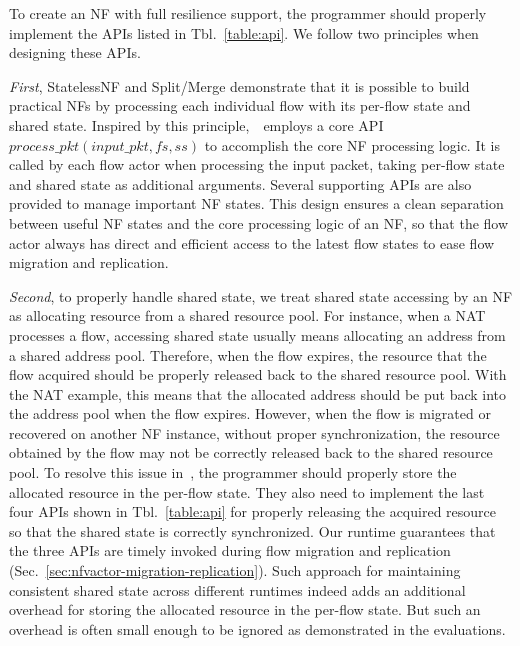To create an NF with full resilience support, the programmer should properly implement the APIs listed in Tbl.~\ref{table:api}. We follow two principles when designing these APIs.

{\em First}, StatelessNF \cite{201545} and Split/Merge \cite{rajagopalan2013split} demonstrate that it is possible to build practical NFs by processing each individual flow with its per-flow state and shared state. Inspired by this principle,~\nfactor~employs a core API $process\_pkt(input\_pkt, fs, ss)$ to accomplish the core NF processing logic. It is called by each flow actor when processing the input packet, taking per-flow state and shared state as additional arguments. Several supporting APIs are also provided to manage important NF states. This design %
 ensures a clean separation between useful NF states and the core processing logic of an NF, so that the flow actor always has direct and efficient access to the latest flow states to ease flow migration and replication.

{\em Second}, to properly handle shared state, we treat shared state accessing by an NF as allocating resource from a shared resource pool. For instance, when a NAT processes a flow, accessing shared state usually means allocating an address from a shared address pool. Therefore, when the flow expires, the resource that the flow acquired should be properly released back to the shared resource pool. With the NAT example, this means that the allocated address should be put back into the address pool when the flow expires. However, when the flow is migrated or recovered on another NF instance, without proper synchronization, the resource obtained by the flow may not be correctly released back to the shared resource pool. To resolve this issue in~\nfactor, the programmer should properly store the allocated resource in the per-flow state. They also need to implement the last four APIs shown in Tbl.~\ref{table:api} for properly releasing the acquired resource so that the shared state is correctly synchronized. Our runtime guarantees that the three APIs are timely invoked during flow migration and replication (Sec.~\ref{sec:nfvactor-migration-replication}). Such approach for maintaining consistent shared state across different runtimes indeed adds an additional overhead for storing the allocated resource in the per-flow state. But such an overhead is often small enough to be ignored as demonstrated in the evaluations. 


